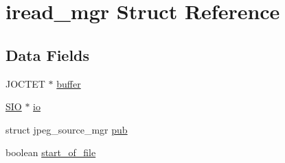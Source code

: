 \hypertarget{structiread__mgr}{\section{iread\-\_\-mgr Struct Reference}
\label{structiread__mgr}
}
\subsection*{Data Fields}
\begin{DoxyCompactItemize}
\item 
J\-O\-C\-T\-E\-T $\ast$ \hyperlink{structiread__mgr_ab52519326423db6890165ce4f4d3d818}{buffer}
\item 
\hyperlink{struct_s_i_o}{S\-I\-O} $\ast$ \hyperlink{structiread__mgr_ab6115e5993ca62edfb3a32ef981294c5}{io}
\item 
struct jpeg\-\_\-source\-\_\-mgr \hyperlink{structiread__mgr_a08cd767bebf8cecc3d859191d67a4955}{pub}
\item 
boolean \hyperlink{structiread__mgr_a34ad202f834df4cfab94b6d7532b737a}{start\-\_\-of\-\_\-file}
\end{DoxyCompactItemize}


